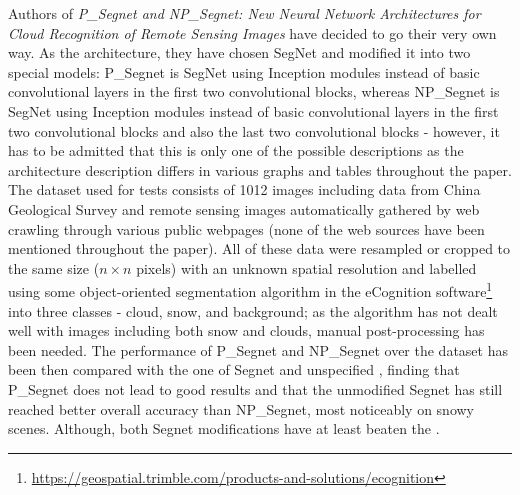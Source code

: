 Authors of \textit{P\_Segnet and NP\_Segnet: New Neural Network Architectures for Cloud Recognition of Remote Sensing Images} have decided to go their very own way. As the architecture, they have chosen SegNet \cite{segnet} and modified it into two special models: P\_Segnet is SegNet using Inception modules \cite{inception} instead of basic convolutional layers in the first two convolutional blocks, whereas NP\_Segnet is SegNet using Inception modules instead of basic convolutional layers in the first two convolutional blocks and also the last two convolutional blocks - however, it has to be admitted that this is only one of the possible descriptions as the architecture description differs in various graphs and tables throughout the paper. The dataset used for tests consists of 1012  images including data from China Geological Survey and remote sensing images automatically gathered by web crawling through various public webpages (none of the web sources have been mentioned throughout the paper). All of these data were resampled or cropped to the same size ($n \times n$ pixels) with an unknown spatial resolution and labelled using some object-oriented segmentation algorithm in the eCognition software\footnote{\url{https://geospatial.trimble.com/products-and-solutions/ecognition}} into three classes - cloud, snow, and background; as the algorithm has not dealt well with images including both snow and clouds, manual post-processing has been needed. The performance of P\_Segnet and NP\_Segnet over the dataset has been then compared with the one of Segnet and unspecified , finding that P\_Segnet does not lead to good results and that the unmodified Segnet has still reached better overall accuracy than NP\_Segnet, most noticeably on snowy scenes. Although, both Segnet modifications have at least beaten the .

